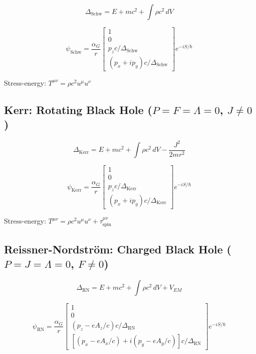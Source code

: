 \documentclass[11pt,a4paper]{article}
\theoremstyle{definition}
\theoremstyle{remark}
\begin{document}
	\begin{equation}
		\Delta_{\mathrm{Schw}} = E + mc^2 + \int\rho c^2\,dV
	\end{equation}
	
	\begin{equation}
		\psi_{\mathrm{Schw}} = \frac{\alpha_G}{r}\begin{bmatrix}1\\0\\ p_zc/\Delta_{\mathrm{Schw}}\\ (p_x+ip_y)c/\Delta_{\mathrm{Schw}}\end{bmatrix}e^{-iS/\hbar}
	\end{equation}
	
	Stress-energy: $T^{\mu\nu} = \rho c^2 u^\mu u^\nu$
	
	\subsection{Kerr: Rotating Black Hole ($P=F=\Lambda=0$, $J\neq0$)}
	
	\begin{equation}
		\Delta_{\mathrm{Kerr}} = E + mc^2 + \int\rho c^2\,dV - \frac{J^2}{2mr^2}
	\end{equation}
	
	\begin{equation}
		\psi_{\mathrm{Kerr}} = \frac{\alpha_G}{r}\begin{bmatrix}1\\0\\ p_zc/\Delta_{\mathrm{Kerr}}\\ (p_x+ip_y)c/\Delta_{\mathrm{Kerr}}\end{bmatrix}e^{-iS/\hbar}
	\end{equation}
	
	Stress-energy: $T^{\mu\nu} = \rho c^2 u^\mu u^\nu + \tau^{\mu\nu}_{\mathrm{spin}}$
	
	\subsection{Reissner-Nordstr\"om: Charged Black Hole ($P=J=\Lambda=0$, $F\neq0$)}
	
	\begin{equation}
		\Delta_{\mathrm{RN}} = E + mc^2 + \int\rho c^2\,dV + V_{EM}
	\end{equation}
	
	\begin{equation}
		\psi_{\mathrm{RN}} = \frac{\alpha_G}{r}\begin{bmatrix}1\\0\\ (p_z-eA_z/c)c/\Delta_{\mathrm{RN}}\\ [(p_x-eA_x/c)+i(p_y-eA_y/c)]c/\Delta_{\mathrm{RN}}\end{bmatrix}e^{-iS/\hbar}
	\end{equation}
	
\end{document}
